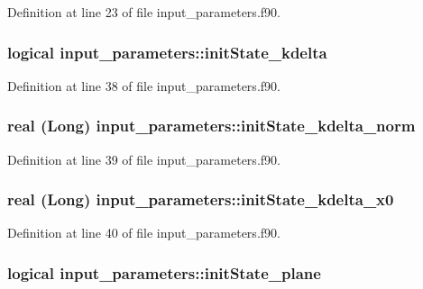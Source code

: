 Definition at line 23 of file input\_\-parameters.f90.

\hypertarget{namespaceinput__parameters_aae45dd03716b9ad9a0600a9d9a798935}{
\subsubsection[{initState\_\-kdelta}]{\setlength{\rightskip}{0pt plus 5cm}logical {\bf input\_\-parameters::initState\_\-kdelta}}}
\label{namespaceinput__parameters_aae45dd03716b9ad9a0600a9d9a798935}


Definition at line 38 of file input\_\-parameters.f90.

\hypertarget{namespaceinput__parameters_a1b2e5c088ab1d39d896586d7fb18b142}{
\subsubsection[{initState\_\-kdelta\_\-norm}]{\setlength{\rightskip}{0pt plus 5cm}real (Long) {\bf input\_\-parameters::initState\_\-kdelta\_\-norm}}}
\label{namespaceinput__parameters_a1b2e5c088ab1d39d896586d7fb18b142}


Definition at line 39 of file input\_\-parameters.f90.

\hypertarget{namespaceinput__parameters_a65eb9165c6a1fd054daefc2a96e7ae2a}{
\subsubsection[{initState\_\-kdelta\_\-x0}]{\setlength{\rightskip}{0pt plus 5cm}real (Long) {\bf input\_\-parameters::initState\_\-kdelta\_\-x0}}}
\label{namespaceinput__parameters_a65eb9165c6a1fd054daefc2a96e7ae2a}


Definition at line 40 of file input\_\-parameters.f90.

\hypertarget{namespaceinput__parameters_a727a13be305b5dde7955fd2d02f955e4}{
\subsubsection[{initState\_\-plane}]{\setlength{\rightskip}{0pt plus 5cm}logical {\bf input\_\-parameters::initState\_\-plane}}}
\label{namespaceinput__parameters_a727a13be305b5dde7955fd2d02f955e4}


